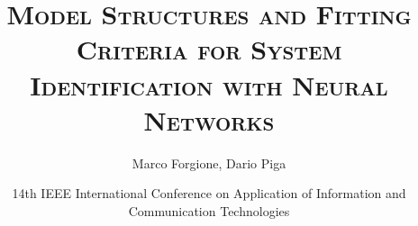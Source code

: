 \usepackage[english]{babel}
\usepackage{amsmath}
\usepackage[latin1]{inputenc}
\usepackage{units}
\usepackage{colortbl}
\usepackage{multimedia}
\usepackage{bm}
\usepackage{subcaption}
\usepackage{algorithm2e}
\usepackage{algorithmic}

{
}
	

\title[Neural System Identification]{\textsc{Model Structures and Fitting Criteria for System Identification with Neural Networks}}


\author[]{Marco Forgione, Dario Piga}



\date[AICT 2020]{14th IEEE International Conference on Application of Information and Communication Technologies}


\subject{System Identification, Deep Learning, Machine Learning, Regularization}


\newcommand{\So}{S_o} %
\newcommand{\hidden}[1]{\overline{#1}}
\newcommand{\nsamp}{N}
\newcommand{\Yid}{Y}
\newcommand{\Uid}{U}
\newcommand{\Did}{{\mathcal{D}}}
\newcommand{\tens}[1]{\bm{#1}}

\newcommand{\batchsize}{q}
\newcommand{\seqlen}{m}
\newcommand{\nin}{n_u} 
\newcommand{\ny}{n_y} 
\newcommand{\nx}{n_x}

\newcommand{\NN}{\mathcal{N}} %

\newcommand{\norm}[1]{\left \lVert #1 \right \rVert}
\DeclareMathOperator*\argmin{arg \, min}
